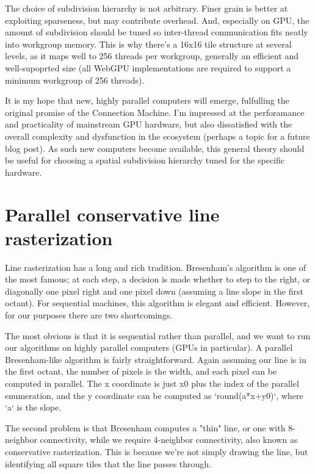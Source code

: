 \documentclass[format=acmsmall]{acmart}
\begin{document}
The choice of subdivision hierarchy is not arbitrary. Finer grain is better at exploiting sparseness, but may contribute overhead. And, especially on GPU, the amount of subdivision should be tuned so inter-thread communication fits neatly into workgroup memory. This is why there's a 16x16 tile structure at several levels, as it maps well to 256 threads per workgroup, generally an efficient and well-supoprted size (all WebGPU implementations are required to support a minimum workgroup of 256 threads).

It is my hope that new, highly parallel computers will emerge, fulfulling the original promise of the Connection Machine. I'm impressed at the perforamance and practicality of mainstream GPU hardware, but also dissatisfied with the overall complexity and dysfunction in the ecosystem (perhaps a topic for a future blog post). As such new computers become available, this general theory should be useful for choosing a spatial subdivision hierarchy tuned for the specific hardware.

\section{Parallel conservative line rasterization}

Line rasterization has a long and rich tradition. Bresenham's algorithm is one of the most famous; at each step, a decision is made whether to step to the right, or diagonally one pixel right and one pixel down (assuming a line slope in the first octant). For sequential machines, this algorithm is elegant and efficient. However, for our purposes there are two shortcomings.

The most obvious is that it is sequential rather than parallel, and we want to run our algorithms on highly parallel computers (GPUs in particular). A parallel Bresenham-like algorithm is fairly straightforward. Again assuming our line is in the first octant, the number of pixels is the width, and each pixel can be computed in parallel. The x coordinate is just x0 plus the index of the parallel enumeration, and the y coordinate can be computed as `round(a*x+y0)`, where `a` is the slope.

The second problem is that Bresenham computes a "thin" line, or one with 8-neighbor connectivity, while we require 4-neighbor connectivity, also known as conservative rasterization. This is because we're not simply drawing the line, but identifying all square tiles that the line passes through.
\end{document}
